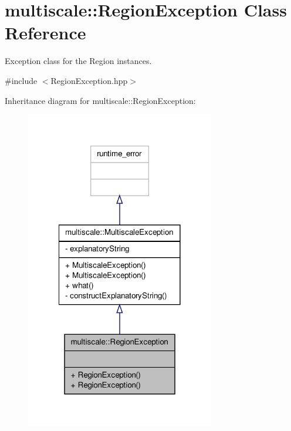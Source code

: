 \hypertarget{classmultiscale_1_1RegionException}{\section{multiscale\-:\-:Region\-Exception Class Reference}
\label{classmultiscale_1_1RegionException}
}


Exception class for the Region instances.  




{\ttfamily \#include $<$Region\-Exception.\-hpp$>$}



Inheritance diagram for multiscale\-:\-:Region\-Exception\-:\nopagebreak
\begin{figure}[H]
\begin{center}
\leavevmode
\includegraphics[width=234pt]{classmultiscale_1_1RegionException__inherit__graph}
\end{center}
\end{figure}


